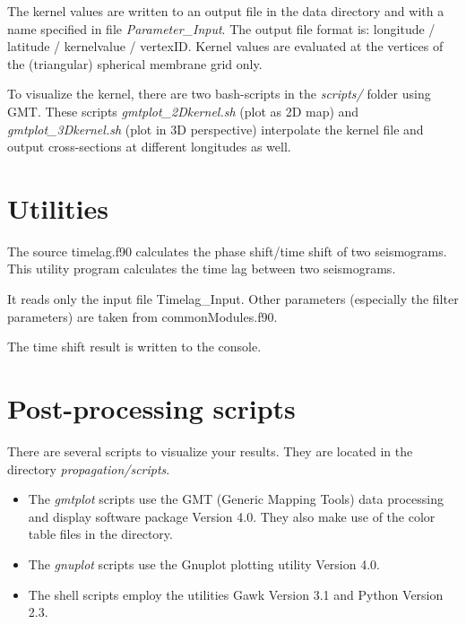 \documentclass[a4paper,
                          headsepline,
                          listof=totoc,
                          toc=listof,
                          headings=small]{scrreprt} %
\begin{document}
The kernel values are written to an output file in the data directory and with a name
specified in file \textit{Parameter\_Input}. The output file format is: longitude / latitude / kernelvalue / vertexID. 
Kernel values are evaluated at the vertices of the (triangular) 
spherical membrane grid only.


To visualize the kernel, there are two bash-scripts in the \textit{scripts/} folder
using GMT. These scripts \textit{gmtplot\_2Dkernel.sh} (plot as 2D map) and 
\textit{gmtplot\_3Dkernel.sh} (plot in 3D perspective) interpolate the kernel file
and output cross-sections at different longitudes as well.




\appendix
\chapter{Utilities}

The source timelag.f90 calculates the phase shift/time shift of two seismograms.
This utility program calculates the time lag between two seismograms.
    
It reads only the input file Timelag\_Input. Other parameters (especially
the filter parameters) are taken from commonModules.f90.

The time shift result is written to the console.


\chapter{Post-processing scripts}
There are several scripts to visualize your results. They are located in the
directory \textit{propagation/scripts}. 


\begin{itemize}
  \item 
The \textit{gmtplot} scripts use the GMT
(Generic Mapping Tools) data processing and display software package Version 4.0. 
They also make use of the color table files in the directory.

  \item 
The \textit{gnuplot} scripts use the Gnuplot plotting utility Version 4.0. 
  
  \item 
The shell scripts employ the utilities Gawk Version 3.1 and Python Version 2.3.
  
\end{itemize}
\end{document}
